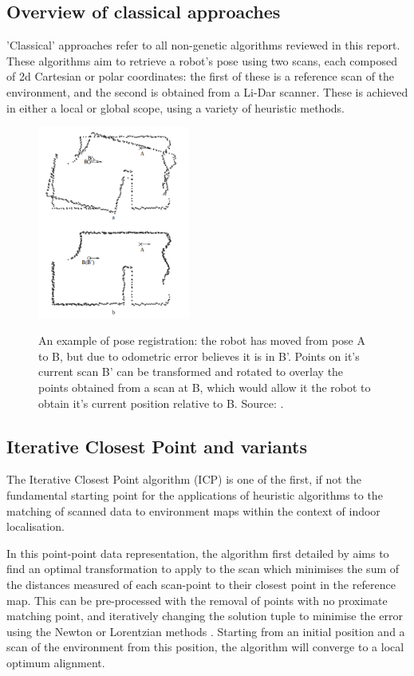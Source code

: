 \documentclass[authoryearcitations]{UoYCSproject}
\begin{document}
\subsection{Overview of classical approaches}
'Classical' approaches refer to all non-genetic algorithms reviewed in this report. These algorithms aim to retrieve a robot's pose using two scans, each composed of 2d Cartesian or polar coordinates: the first of these is a reference scan of the environment, and the second is obtained from a Li-Dar scanner. These is achieved in either a local or global scope, using a variety of heuristic methods.
\begin{figure}[t]
	\centering
	\includegraphics[width=5cm,keepaspectratio]{images/pose_estimation.png}
	\label{fig:pose_estimation}
	\caption{An example of pose registration: the robot has moved from pose A to B, but due to odometric error believes it is in B'. Points on it's current scan B' can be transformed and rotated to overlay the points obtained from a scan at B, which would allow it the robot to obtain it's current position relative to B. Source: \citet{Lu1997-zv}.}
\end{figure}
\subsection{Iterative Closest Point and variants}

The Iterative Closest Point algorithm (ICP) is one of the first, if not the fundamental starting point for the applications of heuristic algorithms to the matching of scanned data to environment maps within the context of indoor localisation.

In this point-point data representation, the algorithm first detailed by \citet{Besl1992-pd} aims to find an optimal transformation to apply to the scan which minimises the sum of the distances measured of each scan-point to their closest point in the reference map. This can be pre-processed with the removal of points with no proximate matching point, and iteratively changing the solution tuple to minimise the error using the Newton or Lorentzian methods \cite{Munoz2005-gt}. Starting from an initial position and a scan of the environment from this position, the algorithm will converge to a local optimum alignment. 
\end{document}
